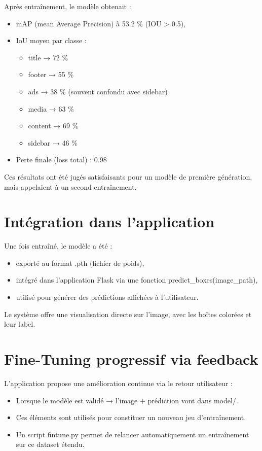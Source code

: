 \documentclass[12pt,a4paper]{report}
\begin{document}
Après entraînement, le modèle obtenait :
\begin{itemize}
\item mAP (mean Average Precision) à 53.2 \% (IOU > 0.5),
\item IoU moyen par classe :
\begin{itemize}
\item title → 72 \%
\item footer → 55 \%
\item ads → 38 \% (souvent confondu avec sidebar)
\item media → 63 \%
\item content → 69 \%
\item sidebar → 46 \%
\end{itemize}
\item Perte finale (loss total) : 0.98
\end{itemize}

Ces résultats ont été jugés satisfaisants pour un modèle de première génération, mais appelaient à un second entraînement.

\section{Intégration dans l'application}

Une fois entraîné, le modèle a été :
\begin{itemize}
\item exporté au format .pth (fichier de poids),
\item intégré dans l'application Flask via une fonction predict\_boxes(image\_path),
\item utilisé pour générer des prédictions affichées à l'utilisateur.
\end{itemize}

Le système offre une visualisation directe sur l'image, avec les boîtes colorées et leur label.

\section{Fine-Tuning progressif via feedback}

L'application propose une amélioration continue via le retour utilisateur :
\begin{itemize}
\item Lorsque le modèle est validé → l'image + prédiction vont dans model/.
\item Ces éléments sont utilisés pour constituer un nouveau jeu d'entraînement.
\item Un script fintune.py permet de relancer automatiquement un entraînement sur ce dataset étendu.
\end{itemize}
\end{document}
